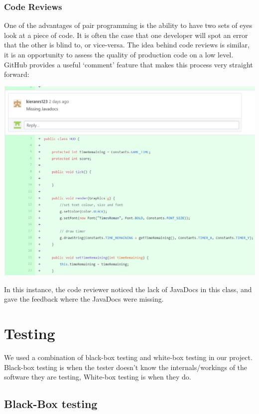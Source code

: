 \documentclass[12pt]{article}
\begin{document}
\subsubsection{Code Reviews}

One of the advantages of pair programming is the ability to have two sets of eyes look at a piece of code. It is often the case that one developer will spot an error that the other is blind to, or vice-versa. The idea behind code reviews is similar, it is an opportunity to assess the quality of production code on a low level. GitHub provides a useful `comment' feature that makes this process very straight forward: 

\begin{center}
    \includegraphics[scale=0.3]{images/code_review.png}
\end{center}

In this instance, the code reviewer noticed the lack of JavaDocs in this class, and gave the feedback where the JavaDocs were missing. 

\newpage

\section{Testing}

We used a combination of black-box testing and white-box testing in our project. Black-box testing is when the tester doesn't know the internals/workings of the software they are testing, White-box testing is when they do.

\subsection{Black-Box testing}
\end{document}
